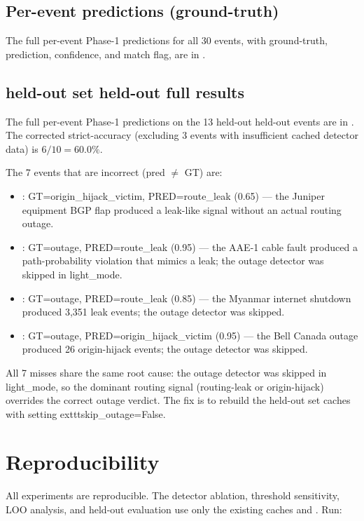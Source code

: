 \documentclass[sigcomm,nonatbib]{acmart}
\begin{document}
\subsection{Per-event predictions (ground-truth)}
\label{supp:per-event-}

The full per-event Phase-1 predictions for all 30 events,
with ground-truth, prediction, confidence, and match flag, are in
.

\subsection{held-out set held-out full results}
\label{supp:held-out set-heldout-full}

The full per-event Phase-1 predictions on the 13 held-out held-out
events are in .
The corrected strict-accuracy (excluding 3 events with
insufficient cached detector data) is $6/10 = 60.0\%$.

The 7 events that are incorrect (pred $\neq$ GT) are:
\begin{itemize}
 \item :
 GT=origin_hijack_victim, PRED=route_leak (0.65) ---
 the Juniper equipment BGP flap produced a leak-like
 signal without an actual routing outage.
 \item :
 GT=outage, PRED=route_leak (0.95) --- the AAE-1 cable
 fault produced a path-probability violation that
 mimics a leak; the outage detector was skipped in
 light_mode.
 \item :
 GT=outage, PRED=route_leak (0.85) --- the Myanmar
 internet shutdown produced 3,351 leak events; the
 outage detector was skipped.
 \item :
 GT=outage, PRED=origin_hijack_victim (0.95) ---
 the Bell Canada outage produced 26 origin-hijack
 events; the outage detector was skipped.
\end{itemize}
All 7 misses share the same root cause: the outage detector
was skipped in light_mode, so the dominant routing signal
(routing-leak or origin-hijack) overrides the correct
outage verdict. The fix is to rebuild the held-out set caches with
setting 	exttt{skip\_outage=False}.

\section{Reproducibility}
\label{supp:reproduce}

All experiments are reproducible. The detector ablation,
threshold sensitivity, LOO analysis, and held-out evaluation
use only the existing caches and
. Run:
\end{document}
